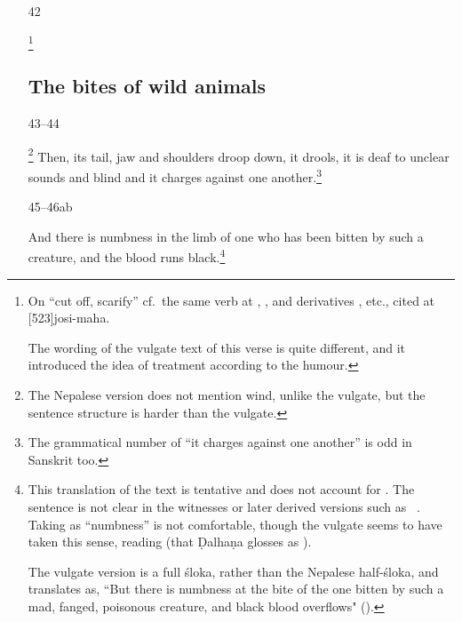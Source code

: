 \begin{translation}
\begin{itemize}
\item[42]

\footnote{On  “cut off, scarify” cf.\ the same
    verb at , , and derivatives
    , etc., cited at
    [523]{josi-maha}.

The wording of the vulgate text of this verse is quite different, and it
introduced the idea of treatment according to the humour.}

\subsection{The bites of wild animals}

\item[43--44]

\footnote{The Nepalese
    version does not mention wind, unlike the vulgate, but the sentence
    structure is harder than the vulgate.}  Then, its tail, jaw and
    shoulders droop down, it drools, it is deaf to unclear sounds and
    blind and it charges against one another.\footnote{The grammatical 
    number of “it charges against one another” is odd in Sanskrit too.}
        
        
        
\item[45--46ab]

And there is numbness in the limb of one who has been bitten by such
a creature, and the blood runs black.\footnote{This translation of
    the text is tentative and does not account for .  The
    sentence is not clear in the witnesses or later derived versions such
    as \AH\ .  Taking  as “numbness” is not
    comfortable, though the vulgate seems to have taken this sense, reading 
     (that Ḍalhaṇa glosses as ).
    
The vulgate version is a full śloka, rather than the Nepalese
half-śloka, and translates as, “But there is numbness at the bite of
the one bitten by such a mad, fanged, poisonous creature, and black
blood overflows" ().
    
}
\end{itemize}
\end{translation}

